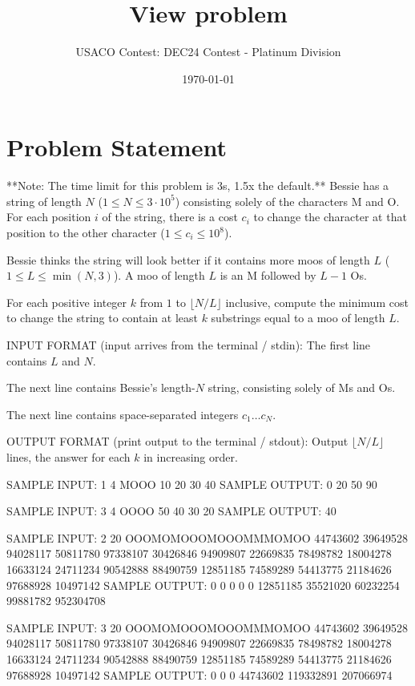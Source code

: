 \documentclass[12pt]{article}
\title{View problem}
\author{USACO Contest: DEC24 Contest - Platinum Division}
\date{\today}
\begin{document}
\maketitle

\section*{Problem Statement}


**Note: The time limit for this problem is 3s, 1.5x the default.**
Bessie has a string of length $N$ ($1\le N\le 3\cdot 10^5$) consisting solely of
the characters M and O. For each position $i$ of the string, there is a cost
$c_i$ to change the character at that position to the other character
($1\le c_i\le 10^8$).

Bessie thinks the string will look better if it contains more moos of length $L$
($1\le L\le \min(N, 3)$). A moo of length $L$ is an M  followed by $L-1$ Os.

For each positive integer $k$ from $1$ to $\lfloor N/L\rfloor$ inclusive,
compute the minimum cost to change the string to contain at least $k$ substrings
equal to a moo of length
$L$.

INPUT FORMAT (input arrives from the terminal / stdin):
The first line contains $L$ and $N$.

The next line contains Bessie's length-$N$ string, consisting solely of Ms and
Os.

The next line contains space-separated integers $c_1\dots c_N$.

OUTPUT FORMAT (print output to the terminal / stdout):
Output $\lfloor N/L\rfloor$ lines, the answer for each $k$ in increasing order.

SAMPLE INPUT:
1 4
MOOO
10 20 30 40
SAMPLE OUTPUT: 
0
20
50
90

SAMPLE INPUT:
3 4
OOOO
50 40 30 20
SAMPLE OUTPUT: 
40

SAMPLE INPUT:
2 20
OOOMOMOOOMOOOMMMOMOO
44743602 39649528 94028117 50811780 97338107 30426846 94909807 22669835 78498782 18004278 16633124 24711234 90542888 88490759 12851185 74589289 54413775 21184626 97688928 10497142
SAMPLE OUTPUT: 
0
0
0
0
0
12851185
35521020
60232254
99881782
952304708

SAMPLE INPUT:
3 20
OOOMOMOOOMOOOMMMOMOO
44743602 39649528 94028117 50811780 97338107 30426846 94909807 22669835 78498782 18004278 16633124 24711234 90542888 88490759 12851185 74589289 54413775 21184626 97688928 10497142
SAMPLE OUTPUT: 
0
0
0
44743602
119332891
207066974
\end{document}
